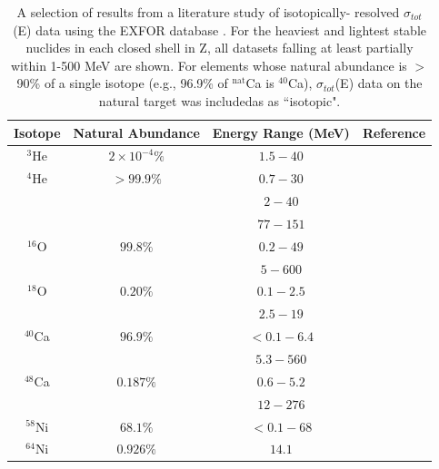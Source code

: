 \documentclass[twocolumn,secnumarabic,amssymb, nobibnotes, aps, prl,
superscriptaddress, nobalancelastpage]{revtex4}
\newcommand{\totEs}{\ensuremath{\sigma_{tot}}(E)\,\,}
\begin{document}
\begin{table}[ht]
    \caption{A selection of results from a literature study of isotopically-
    resolved \totEs data using the EXFOR database \cite{EXFORDatabase}. For the
    heaviest and lightest stable nuclides in each closed shell in Z, all
    datasets falling at least partially within 1-500 MeV are shown. For elements
    whose natural abundance is $>$90\% of a single isotope (e.g.,
    96.9\% of $^{\text{nat}}$Ca is $^{40}$Ca), \totEs data on the natural
    target was includedas as ``isotopic".} \label{tab:title}
    \label{IsotopicCrossSectionTable}
    \begin{center}
        \begin{tabular}{ c c c c }
            \hline
            Isotope & Natural Abundance & Energy Range (MeV) & Reference\\
            \hline

            $^{3}$He & $2\times 10^{-4}\%$ & $1.5 - 40$ & \cite{Haesner1983}\\
            $^{4}$He & $>99.9\%$ & $0.7-30$ & \cite{Goulding1973}\\
            & & $2-40$ & \cite{Haesner1983}\\
            & & $77-151$ & \cite{Measday1966}\\

            $^{16}$O & $99.8\%$ & $0.2-49$ & \cite{Perey1972}\\
            & & $5-600$ & \cite{Finlay1993}\\

            $^{18}$O & $0.20\%$ & $0.1-2.5$ & \cite{Vaughn1965}\\
            & & $2.5-19$ & \cite{Salisbury1965}\\

            $^{40}$Ca & $96.9\%$ & $<0.1-6.4$ & \cite{Johnson1973}\\
            & & $5.3-560$ & \cite{Abfalterer2001}\\

            $^{48}$Ca & $0.187\%$ & $0.6-5.2$ & \cite{Harvey1985}\\
            & & $12-276$ & \cite{Shane2010}\\

            $^{58}$Ni & $68.1\%$ & $<0.1-68$ & \cite{Perey1993}\\

            $^{64}$Ni & $0.926\%$ & $14.1$ & \cite{Dukarevich1967}\\


\end{tabular}
\end{center}
\end{table}
\end{document}

